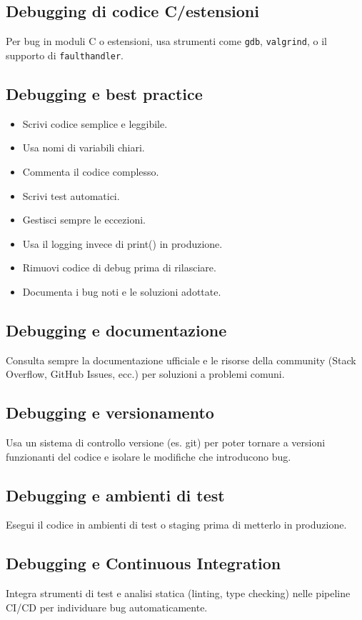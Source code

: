 \documentclass[a4paper,12pt]{article}
\begin{document}
\subsection*{Debugging di codice C/estensioni}
Per bug in moduli C o estensioni, usa strumenti come \texttt{gdb}, \texttt{valgrind}, o il supporto di \texttt{faulthandler}.

\subsection*{Debugging e best practice}
\begin{itemize}
    \item Scrivi codice semplice e leggibile.
    \item Usa nomi di variabili chiari.
    \item Commenta il codice complesso.
    \item Scrivi test automatici.
    \item Gestisci sempre le eccezioni.
    \item Usa il logging invece di print() in produzione.
    \item Rimuovi codice di debug prima di rilasciare.
    \item Documenta i bug noti e le soluzioni adottate.
\end{itemize}

\subsection*{Debugging e documentazione}
Consulta sempre la documentazione ufficiale e le risorse della community (Stack Overflow, GitHub Issues, ecc.) per soluzioni a problemi comuni.

\subsection*{Debugging e versionamento}
Usa un sistema di controllo versione (es. git) per poter tornare a versioni funzionanti del codice e isolare le modifiche che introducono bug.

\subsection*{Debugging e ambienti di test}
Esegui il codice in ambienti di test o staging prima di metterlo in produzione.

\subsection*{Debugging e Continuous Integration}
Integra strumenti di test e analisi statica (linting, type checking) nelle pipeline CI/CD per individuare bug automaticamente.
\end{document}
